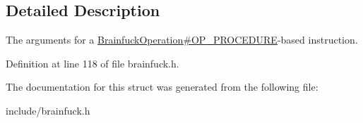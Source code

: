 \subsection{Detailed Description}
The arguments for a \hyperlink{group__ast_ggac30413d006b783ec42faef68b2aa6c12a509f8710cbb162ea87eb762a04fa7d05}{Brainfuck\+Operation\#\+O\+P\+\_\+\+P\+R\+O\+C\+E\+D\+U\+R\+E}-\/based instruction. 

Definition at line 118 of file brainfuck.\+h.



The documentation for this struct was generated from the following file\+:\begin{DoxyCompactItemize}
\item 
include/brainfuck.\+h\end{DoxyCompactItemize}
